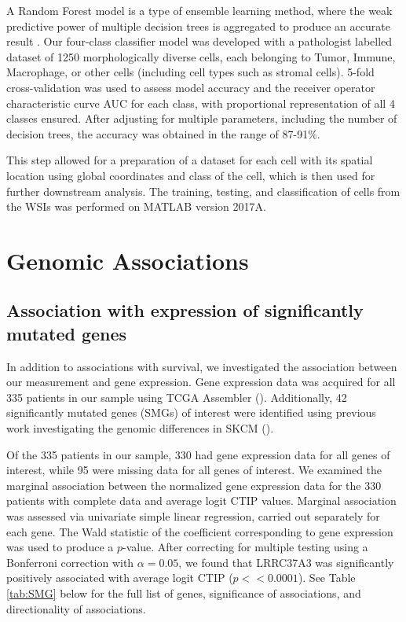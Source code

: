 \documentclass[
]{book}
\begin{document}
A Random Forest model is a type of ensemble learning method, where the weak predictive power of multiple decision trees is aggregated to produce an accurate result \citet{Breiman01}. Our four-class classifier model was developed with a pathologist labelled dataset of 1250 morphologically diverse cells, each belonging to Tumor, Immune, Macrophage, or other cells (including cell types such as stromal cells). 5-fold cross-validation was used to assess model accuracy and the receiver operator characteristic curve AUC for each class, with proportional representation of all 4 classes ensured. After adjusting for multiple parameters, including the number of decision trees, the accuracy was obtained in the range of 87-91\%.

This step allowed for a preparation of a dataset for each cell with its spatial location using global coordinates and class of the cell, which is then used for further downstream analysis. The training, testing, and classification of cells from the WSIs was performed on MATLAB version 2017A.

\hypertarget{genomic-associations}{%
\chapter{Genomic Associations}\label{genomic-associations}}

\hypertarget{association-with-expression-of-significantly-mutated-genes}{%
\section{Association with expression of significantly mutated genes}\label{association-with-expression-of-significantly-mutated-genes}}

In addition to associations with survival, we investigated the
association between our measurement and gene expression. Gene
expression data was acquired for all 335 patients in
our sample using TCGA Assembler (\citet{Zhu14}). Additionally,
42 significantly mutated genes (SMGs) of interest were identified
using previous work investigating the genomic differences in
SKCM (\citet{Akbani15}).

Of the 335 patients in our sample, 330 had gene expression data
for all genes of interest, while 95 were missing data for all
genes of interest. We examined the marginal association between
the normalized gene expression data for the 330 patients with
complete data and average logit CTIP values. Marginal association
was assessed via univariate simple linear regression, carried out
separately for each gene. The Wald statistic of the coefficient
corresponding to gene expression was used to produce a \(p\)-value.
After correcting for multiple testing using a Bonferroni correction with \(\alpha = 0.05\), we found that LRRC37A3 was significantly positively associated with
average logit CTIP (\(p << 0.0001\)). See Table \ref{tab:SMG} below for the full list of genes, significance of associations, and directionality of associations.
\end{document}
